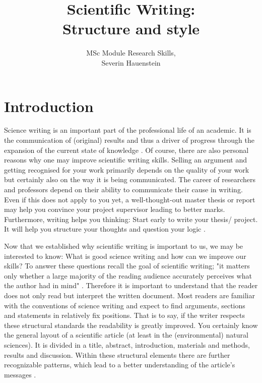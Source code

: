 \documentclass[justified, notoc]{tufte-book} %
\title{Scientific Writing:\\
	\large{Structure and style}}
\author{MSc Module Research Skills,\\
	\small{Severin Hauenstein}}
\begin{document}
	\let\cleardoublepage\clearpage
	\maketitle
	\thispagestyle{empty}
	\null
	\vfill
\begin{fullwidth}
	\tableofcontents
\end{fullwidth}


\chapter{Introduction}
\begin{fullwidth}
Science writing is an important part of the professional life of an academic. It is the communication of (original) results and thus a driver of progress through the expansion of the current state of knowledge \citep{Tischler1978}.
Of course, there are also personal reasons why one may improve scientific writing skills. Selling an argument and getting recognised for your work primarily depends on the quality of your work but certainly also on the way it is being communicated. 
The career of researchers and professors depend on their ability to communicate their cause in writing. Even if this does not apply to you yet, a well-thought-out master thesis or report may help you convince your project supervisor leading to better marks.  
Furthermore, writing helps you thinking: Start early to write your thesis/ project. It will help you structure your thoughts and question your logic \citep{Woodford1967}.

Now that we established why scientific writing is important to us, we may be interested to know: What is good science writing and how can we improve our skills? 
To answer these questions recall the goal of scientific writing; "it matters only whether a large majority of the reading audience accurately perceives what the author had in mind" \citep{Gopen1990}. Therefore it is important to understand that the reader does not only read but interpret the written document. Most readers are familiar with the conventions of science writing and expect to find arguments, sections and statements in relatively fix positions. That is to say, if the writer respects these structural standards the readability is greatly improved. 
You certainly know the general layout of a scientific article (at least in the (environmental) natural sciences). It is divided in a title, abstract, introduction, materials and methods, results and discussion. Within these structural elements there are further recognizable patterns, which lead to a better understanding of the article's messages \citep{Gopen1990,Tischler1978}.  


\end{fullwidth}
\end{document}
